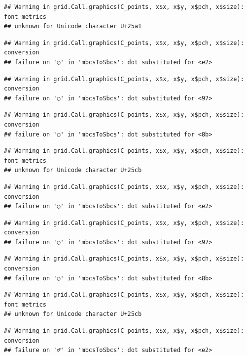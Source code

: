 \documentclass[
]{book}
\begin{document}
\begin{verbatim}
## Warning in grid.Call.graphics(C_points, x$x, x$y, x$pch, x$size): font metrics
## unknown for Unicode character U+25a1
\end{verbatim}

\begin{verbatim}
## Warning in grid.Call.graphics(C_points, x$x, x$y, x$pch, x$size): conversion
## failure on '○' in 'mbcsToSbcs': dot substituted for <e2>
\end{verbatim}

\begin{verbatim}
## Warning in grid.Call.graphics(C_points, x$x, x$y, x$pch, x$size): conversion
## failure on '○' in 'mbcsToSbcs': dot substituted for <97>
\end{verbatim}

\begin{verbatim}
## Warning in grid.Call.graphics(C_points, x$x, x$y, x$pch, x$size): conversion
## failure on '○' in 'mbcsToSbcs': dot substituted for <8b>
\end{verbatim}

\begin{verbatim}
## Warning in grid.Call.graphics(C_points, x$x, x$y, x$pch, x$size): font metrics
## unknown for Unicode character U+25cb
\end{verbatim}

\begin{verbatim}
## Warning in grid.Call.graphics(C_points, x$x, x$y, x$pch, x$size): conversion
## failure on '○' in 'mbcsToSbcs': dot substituted for <e2>
\end{verbatim}

\begin{verbatim}
## Warning in grid.Call.graphics(C_points, x$x, x$y, x$pch, x$size): conversion
## failure on '○' in 'mbcsToSbcs': dot substituted for <97>
\end{verbatim}

\begin{verbatim}
## Warning in grid.Call.graphics(C_points, x$x, x$y, x$pch, x$size): conversion
## failure on '○' in 'mbcsToSbcs': dot substituted for <8b>
\end{verbatim}

\begin{verbatim}
## Warning in grid.Call.graphics(C_points, x$x, x$y, x$pch, x$size): font metrics
## unknown for Unicode character U+25cb
\end{verbatim}

\begin{verbatim}
## Warning in grid.Call.graphics(C_points, x$x, x$y, x$pch, x$size): conversion
## failure on '♂' in 'mbcsToSbcs': dot substituted for <e2>
\end{verbatim}
\end{document}
